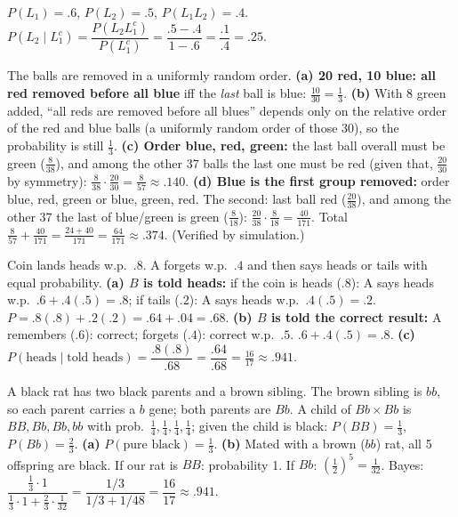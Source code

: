 \documentclass[11pt]{article}
\begin{document}
\begin{exbox}
$P(L_1)=.6$, $P(L_2)=.5$, $P(L_1L_2)=.4$. $P(L_2\mid L_1^c)=\dfrac{P(L_2L_1^c)}{P(L_1^c)}=\dfrac{.5-.4}{1-.6}=\dfrac{.1}{.4}=\boxed{.25}$.
\end{exbox}

\begin{exbox}
The balls are removed in a uniformly random order. \textbf{(a) 20 red, 10 blue: all red removed before all blue}  iff the \emph{last} ball is blue: $\tfrac{10}{30}=\boxed{\tfrac13}$. \textbf{(b)} With 8 green added, ``all reds are removed before all blues'' depends only on the relative order of the red and blue balls (a uniformly random order of those 30), so the probability is still $\boxed{\tfrac13}$. \textbf{(c) Order blue, red, green:} the last ball overall must be green ($\tfrac8{38}$), and among the other 37 balls the last one must be red (given that, $\tfrac{20}{30}$ by symmetry): $\tfrac8{38}\cdot\tfrac{20}{30}=\boxed{\tfrac8{57}}\approx.140$. \textbf{(d) Blue is the first group removed:} order blue, red, green or blue, green, red. The second: last ball red ($\tfrac{20}{38}$), and among the other 37 the last of blue/green is green ($\tfrac8{18}$): $\tfrac{20}{38}\cdot\tfrac8{18}=\tfrac{40}{171}$. Total $\tfrac8{57}+\tfrac{40}{171}=\tfrac{24+40}{171}=\boxed{\tfrac{64}{171}}\approx.374$. (Verified by simulation.)
\end{exbox}

\begin{exbox}
Coin lands heads w.p.\ $.8$. A forgets w.p.\ $.4$ and then says heads or tails with equal probability. \textbf{(a) $B$ is told heads:} if the coin is heads ($.8$): A says heads w.p.\ $.6+.4(.5)=.8$; if tails ($.2$): A says heads w.p.\ $.4(.5)=.2$. $P=.8(.8)+.2(.2)=.64+.04=\boxed{.68}$. \textbf{(b) $B$ is told the correct result:} A remembers ($.6$): correct; forgets ($.4$): correct w.p.\ $.5$. $.6+.4(.5)=\boxed{.8}$. \textbf{(c)} $P(\text{heads}\mid\text{told heads})=\dfrac{.8(.8)}{.68}=\dfrac{.64}{.68}=\boxed{\tfrac{16}{17}}\approx.941$.
\end{exbox}

\begin{exbox}
A black rat has two black parents and a brown sibling. The brown sibling is $bb$, so each parent carries a $b$ gene; both parents are $Bb$. A child of $Bb\times Bb$ is $BB,Bb,Bb,bb$ with prob.\ $\tfrac14,\tfrac14,\tfrac14,\tfrac14$; given the child is black: $P(BB)=\tfrac13$, $P(Bb)=\tfrac23$. \textbf{(a)} $P(\text{pure black})=\boxed{\tfrac13}$. \textbf{(b)} Mated with a brown ($bb$) rat, all 5 offspring are black. If our rat is $BB$: probability 1. If $Bb$: $(\tfrac12)^5=\tfrac1{32}$. Bayes: $\dfrac{\frac13\cdot1}{\frac13\cdot1+\frac23\cdot\frac1{32}}=\dfrac{1/3}{1/3+1/48}=\dfrac{16}{17}\approx\boxed{.941}$.
\end{exbox}
\end{document}
